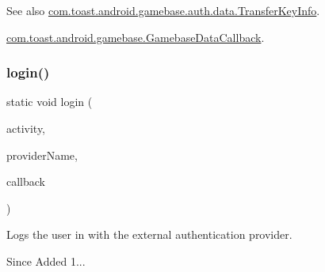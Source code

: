 \begin{DoxySeeAlso}{See also}
\hyperlink{classcom_1_1toast_1_1android_1_1gamebase_1_1auth_1_1data_1_1_transfer_key_info}{com.\+toast.\+android.\+gamebase.\+auth.\+data.\+Transfer\+Key\+Info}. 

\hyperlink{interfacecom_1_1toast_1_1android_1_1gamebase_1_1_gamebase_data_callback}{com.\+toast.\+android.\+gamebase.\+Gamebase\+Data\+Callback}. 
\end{DoxySeeAlso}
\mbox{\label{classcom_1_1toast_1_1android_1_1gamebase_1_1_gamebase_a277a8a1672aeb0ac6b20e7ebcd4e09b5}} 
\subsubsection{\texorpdfstring{login()}{login()}\hspace{0.1cm}{\footnotesize\ttfamily [1/3]}}
{\footnotesize\ttfamily static void login (\begin{DoxyParamCaption}\item[{@Non\+Null final Activity}]{activity,  }\item[{final String}]{provider\+Name,  }\item[{@Nullable final \hyperlink{interfacecom_1_1toast_1_1android_1_1gamebase_1_1_gamebase_data_callback}{Gamebase\+Data\+Callback}$<$ \hyperlink{classcom_1_1toast_1_1android_1_1gamebase_1_1auth_1_1data_1_1_auth_token}{Auth\+Token} $>$}]{callback }\end{DoxyParamCaption})\hspace{0.3cm}{\ttfamily [static]}}



Logs the user in with the external authentication provider. 

\begin{DoxySince}{Since}
Added 1... 
\end{DoxySince}

